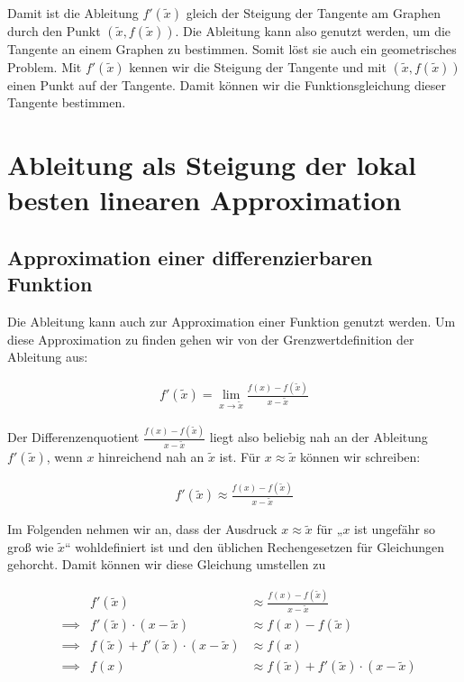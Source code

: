 \documentclass[fontsize=9pt,
               parskip=half-,
               DIV=14,
               listof=chapterentry,
               tocflat]{scrbook}
\begin{document}
Damit ist die Ableitung $f'({\tilde {x}})$ gleich der Steigung der Tangente am Graphen durch den Punkt $({\tilde {x}},f({\tilde {x}}))$. Die Ableitung kann also genutzt werden, um die Tangente an einem Graphen zu bestimmen. Somit löst sie auch ein geometrisches Problem. Mit $f'({\tilde {x}})$ kennen wir die Steigung der Tangente und mit $({\tilde {x}},f({\tilde {x}}))$ einen Punkt auf der Tangente. Damit können wir die Funktionsgleichung dieser Tangente bestimmen.

\section{Ableitung als Steigung der lokal besten linearen Approximation}

\subsection{Approximation einer differenzierbaren Funktion}

Die Ableitung kann auch zur Approximation einer Funktion genutzt werden. Um diese Approximation zu finden gehen wir von der Grenzwertdefinition der Ableitung aus:

\begin{align*}
f'({\tilde {x}})=\lim _{x\to {\tilde {x}}}{\frac {f(x)-f({\tilde {x}})}{x-{\tilde {x}}}}
\end{align*}

Der Differenzenquotient ${\tfrac {f(x)-f({\tilde {x}})}{x-{\tilde {x}}}}$ liegt also beliebig nah an der Ableitung $f'({\tilde {x}})$, wenn $x$ hinreichend nah an ${\tilde {x}}$ ist. Für $x\approx {\tilde {x}}$ können wir schreiben:

\begin{align*}
f'({\tilde {x}})\approx {\frac {f(x)-f({\tilde {x}})}{x-{\tilde {x}}}}
\end{align*}

Im Folgenden nehmen wir an, dass der Ausdruck $x\approx {\tilde {x}}$ für „$x$ ist ungefähr so groß wie ${\tilde {x}}$“ wohldefiniert ist und den üblichen Rechengesetzen für Gleichungen gehorcht. Damit können wir diese Gleichung umstellen zu

\begin{align*}
&&f'({\tilde {x}})&\approx {\frac {f(x)-f({\tilde {x}})}{x-{\tilde {x}}}}\\[0.3em]&\implies {}&f'({\tilde {x}})\cdot (x-{\tilde {x}})&\approx f(x)-f({\tilde {x}})\\[0.3em]&\implies {}&f({\tilde {x}})+f'({\tilde {x}})\cdot (x-{\tilde {x}})&\approx f(x)\\[0.3em]&\implies {}&f(x)&\approx f({\tilde {x}})+f'({\tilde {x}})\cdot (x-{\tilde {x}})
\end{align*}
\end{document}
